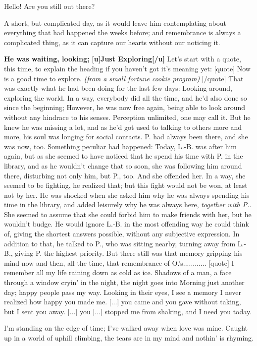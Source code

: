 Hello! Are you still out there?

A short, but complicated day, as it would leave him contemplating about everything that had happened the weeks before; and remembrance is always a complicated thing, as it can capture our hearts without our noticing it. 

\textbf{He was waiting, looking;}
\textbf{[u]Just Exploring[/u]}
Let's start with a quote, this time, to explain the heading if you haven't got it's meaning yet: 
[quote]
Now is a good time to explore. 
\emph{(from a small fortune cookie program)}
[/quote]
That was exactly what he had been doing for the last few days: Looking around, exploring the world. In a way, everybody did all the time, and he'd also done so since the beginning; However, he was now free again, being able to look around without any hindrace to his senses. 
Perception unlimited, one may call it. 
But he knew he was missing a lot, and as he'd got used to talking to others more and more, his soul was longing for social contacts. 
P. had always been there, and she was now, too. 
Something peculiar had happened: Today, L.-B. was after him again, but as she seemed to have noticed that he spend his time with P. in the library, and as he wouldn't change that so soon, she was following him around there, disturbing not only him, but P., too. 
And she offended her. 
In a way, she seemed to be fighting, he realized that; but this fight would not be won, at least not by her. 
He was shocked when she asked him why he was always spending his time in the library, and added leisurely why he was always here, \emph{together with P.}. She seemed to assume that she could forbid him to make friends with her, but he wouldn't budge. 
He would ignore L.-B. in the most offending way he could think of, giving the shortest answers possible, without any subjective expression. 
In addition to that, he talked to P., who was sitting nearby, turning away from L.-B., giving P. the highest priority. 
But there still was that memory gripping his mind now and then, all the time, that remembrance of O.'s............
[quote]
I remember all my life 
raining down as cold as ice. 
Shadows of a man, 
a face through a window cryin' in the night, 
the night goes into 
Morning just another day; 
happy people pass my way. 
Looking in their eyes, 
I see a memory I never realized how happy you made me. 
[...]
you came and you gave without taking, 
but I sent you away. 
[...]
you [...] stopped me from shaking, 
and I need you today. 

I'm standing on the edge of time; 
I've walked away when love was mine. 
Caught up in a world of uphill climbing, 
the tears are in my mind and nothin' is rhyming. 


